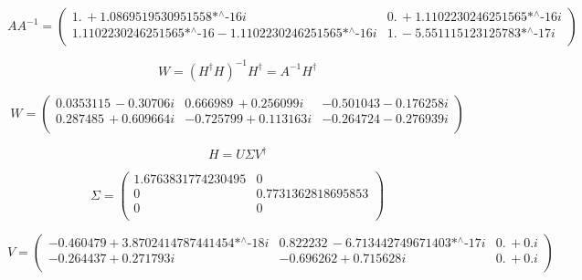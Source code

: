 \begin{equation}
A A^{-1}=\left(
\begin{array}{cc}
 1.\, +\text{1.0869519530951558$\grave{ }$*${}^{\wedge}$-16} i & 0.\, +\text{1.1102230246251565$\grave{ }$*${}^{\wedge}$-16} i \\
 \text{1.1102230246251565$\grave{ }$*${}^{\wedge}$-16}-\text{1.1102230246251565$\grave{ }$*${}^{\wedge}$-16} i & 1.\, -\text{5.551115123125783$\grave{ }$*${}^{\wedge}$-17} i \\
\end{array}
\right)
\end{equation}


\begin{equation}
W=(H^{\dagger} H)^{-1}H^{\dagger}=A^{-1}H^{\dagger}
\end{equation}


\begin{equation}
W=\left(
\begin{array}{ccc}
 0.0353115\, -0.30706 i & 0.666989\, +0.256099 i & -0.501043-0.176258 i \\
 0.287485\, +0.609664 i & -0.725799+0.113163 i & -0.264724-0.276939 i \\
\end{array}
\right)
\end{equation}



\begin{equation}
H=U\Sigma V^{\dagger}
\end{equation}


\begin{equation}
\Sigma=\left(
\begin{array}{cc}
 1.6763831774230495  & 0 \\
0 &0.7731362818695853  \\
0 & 0 \\
\end{array}
\right)
\end{equation}




\begin{equation}
V=\left(
\begin{array}{ccc}
 -0.460479+\text{3.8702414787441454$\grave{ }$*${}^{\wedge}$-18} i & 0.822232\, -\text{6.713442749671403$\grave{ }$*${}^{\wedge}$-17} i & 0.\, +0. i \\
 -0.264437+0.271793 i & -0.696262+0.715628 i & 0.\, +0. i \\
\end{array}
\right)
\end{equation}



